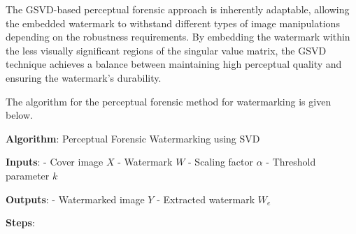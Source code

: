 \documentclass[
  journal,
]{IEEEtran}%
\begin{document}
The GSVD-based perceptual forensic approach is inherently adaptable,
allowing the embedded watermark to withstand different types of image
manipulations depending on the robustness requirements. By embedding the
watermark within the less visually significant regions of the singular
value matrix, the GSVD technique achieves a balance between maintaining
high perceptual quality and ensuring the watermark's durability.

The algorithm for the perceptual forensic method for watermarking is
given below.

\label{algo-PFA}
\textbf{Algorithm}: Perceptual Forensic Watermarking using SVD

\textbf{Inputs}: - Cover image \(X\) - Watermark \(W\) - Scaling factor
\(\alpha\) - Threshold parameter \(k\)

\textbf{Outputs}: - Watermarked image \(Y\) - Extracted watermark
\(W_e\)

\textbf{Steps}:
\end{document}
